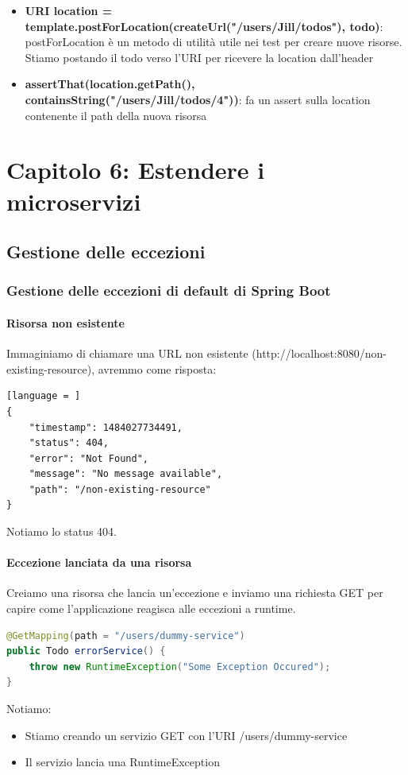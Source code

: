 \documentclass[11pt,a4paper]{book}
\begin{document}
\begin{itemize}
	\item \textbf{URI location =
		template.postForLocation(createUrl("/users/Jill/todos"),
		todo)}: postForLocation è un metodo di utilità utile nei test per creare nuove risorse. Stiamo postando il todo verso l'URI per ricevere la location dall'header
	\item \textbf{assertThat(location.getPath(), 
		containsString("/users/Jill/todos/4"))}: fa un assert sulla location contenente il path della nuova risorsa
\end{itemize}

\section{Capitolo 6: Estendere i microservizi}
\subsection{Gestione delle eccezioni}
\subsubsection{Gestione delle eccezioni di default di Spring Boot}
\paragraph{Risorsa non esistente}

Immaginiamo di chiamare una URL non esistente (http://localhost:8080/non-existing-resource), avremmo come risposta:
\begin{lstlisting}[language = ]
{
	"timestamp": 1484027734491,
	"status": 404,
	"error": "Not Found",
	"message": "No message available",
	"path": "/non-existing-resource"
}
\end{lstlisting}
Notiamo lo status 404.

\paragraph{Eccezione lanciata da una risorsa}
Creiamo una risorsa che lancia un'eccezione e inviamo una richiesta GET per capire come l'applicazione reagisca alle eccezioni a runtime.
\begin{lstlisting}[language = Java]
@GetMapping(path = "/users/dummy-service")
public Todo errorService() {
	throw new RuntimeException("Some Exception Occured");
}
\end{lstlisting}
Notiamo:
\begin{itemize}
	\item Stiamo creando un servizio GET con l'URI /users/dummy-service
	\item Il servizio lancia una RuntimeException
\end{itemize}
\end{document}
